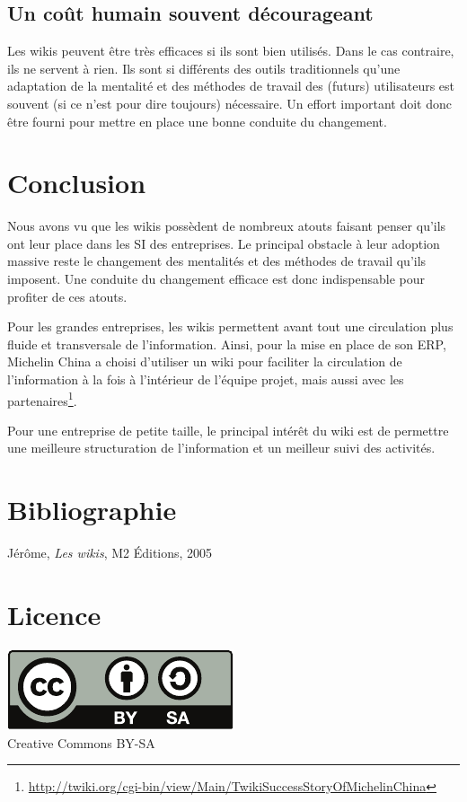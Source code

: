 \documentclass[pdftex,a4paper,11pt]{article}
\begin{document}
\subsection{Un coût humain souvent décourageant}
Les wikis peuvent être très efficaces si ils sont bien utilisés. Dans le cas contraire, ils ne servent à rien. Ils sont si différents des outils traditionnels qu'une adaptation de la mentalité et des méthodes de travail des (futurs) utilisateurs est souvent (si ce n'est pour dire toujours) nécessaire. Un effort important doit donc être fourni pour mettre en place une bonne conduite du changement.


\section*{Conclusion}
Nous avons vu que les wikis possèdent de nombreux atouts faisant penser qu'ils ont leur place dans les SI des entreprises. Le principal obstacle à leur adoption massive reste le changement des mentalités et des méthodes de travail qu'ils imposent. Une conduite du changement efficace est donc indispensable pour profiter de ces atouts.

Pour les grandes entreprises, les wikis permettent avant tout une circulation plus fluide et transversale de l'information. Ainsi, pour la mise en place de son ERP, Michelin China a choisi d'utiliser un wiki pour faciliter la circulation de l'information à la fois à l'intérieur de l'équipe projet, mais aussi avec les partenaires\footnote{\url{http://twiki.org/cgi-bin/view/Main/TwikiSuccessStoryOfMichelinChina}}.

Pour une entreprise de petite taille, le principal intérêt du wiki est de permettre une meilleure structuration de l'information et un meilleur suivi des activités.


\section*{Bibliographie}
 Jérôme, \emph{Les wikis}, M2 Éditions, 2005


\section*{Licence}

\begin{center}
    \href{http://creativecommons.org/licenses/by-sa/2.0/fr/}{\includegraphics[width=.30\linewidth]{images/cc_by_sa}}\\
	Creative Commons BY-SA
\end{center}
\end{document}
